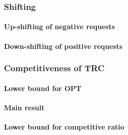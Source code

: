 \subsubsection{Shifting}
\paragraph{Up-shifting of negative requests}
\paragraph{Down-shifting of positive requests}

\subsubsection{Competitiveness of TRC}
\paragraph{Lower bound for OPT}
\paragraph{Main result}
\paragraph{Lower bound for competitive ratio}
